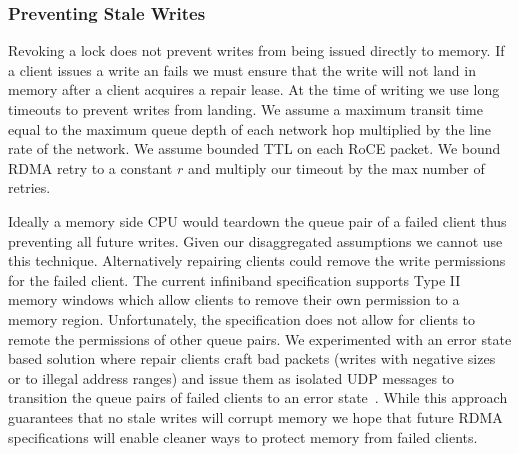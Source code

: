 \subsubsection{Preventing Stale Writes}
\label{sec:stale-writes}
Revoking a lock does not prevent writes from being issued
directly to memory. If a client issues a write an fails we
must ensure that the write will not land in memory after a
client acquires a repair lease. At the time of writing we
use long timeouts to prevent writes from landing. We assume
a maximum transit time equal to the maximum queue depth of
each network hop multiplied by the line rate of the network.
We assume bounded TTL on each RoCE packet. We bound RDMA
retry to a constant $r$ and multiply our timeout by the max
number of retries.

Ideally a memory side CPU would teardown the queue pair of a
failed client thus preventing all future writes. Given our
disaggregated assumptions we cannot use this technique.
Alternatively repairing clients could remove the write
permissions for the failed client. The current infiniband
specification supports Type II memory windows which allow
clients to remove their own permission to a memory region.
Unfortunately, the specification does not allow for clients
to remote the permissions of other queue pairs. We
experimented with an error state based solution where repair
clients craft bad packets (writes with negative sizes or to
illegal address ranges) and issue them as isolated UDP
messages to transition the queue pairs of failed clients to
an error state~\cite{redmark}. While this approach
guarantees that no stale writes will corrupt memory we hope
that future RDMA specifications will enable cleaner ways to
protect memory from failed clients.


